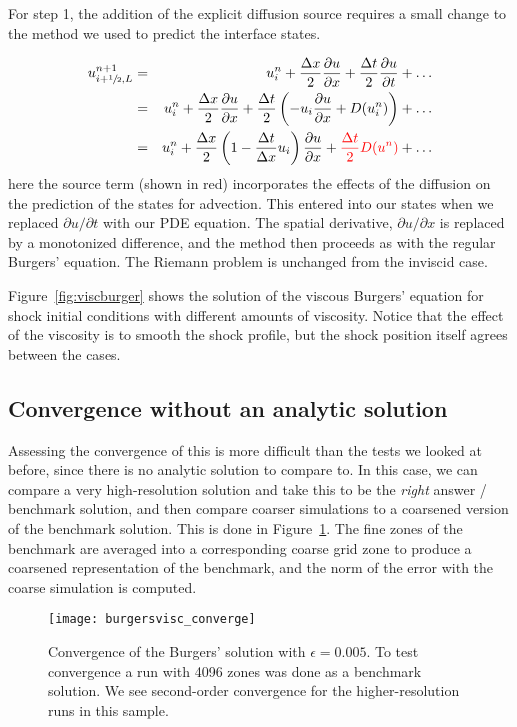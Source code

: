 For step 1, the addition of the explicit diffusion source requires
a small change to the method we used to predict the interface states.

\begin{eqnarray}
u^{n+1}_{i+{\sfrac{1}{2}},L} &=& u^n_i + \frac{\Delta x}{2} \frac{\partial u}{\partial x}
                        + \frac{\Delta t}{2} \frac{\partial u}{\partial t} + \ldots \\
                &=& u^n_i + \frac{\Delta x}{2} \frac{\partial u}{\partial x}
                        + \frac{\Delta t}{2} \left (-u_i \frac{\partial u}{\partial x} + D(u^n_i) \right ) + \ldots \\
                &=& u^n_i + \frac{\Delta x}{2} \left ( 1 - \frac{\Delta t}{\Delta x}u_i \right ) \frac{\partial u}{\partial x} + {\color{red} \frac{\Delta t}{2} D(u^n) } + \ldots
\end{eqnarray}
here the source term (shown in red) incorporates the effects of the
diffusion on the prediction of the states for advection.  This entered
into our states when we replaced $\partial u/\partial t$ with our PDE
equation.  The spatial derivative, $\partial u/\partial x$ is replaced
by a monotonized difference, and the method then proceeds as with the
regular Burgers' equation.  The Riemann problem is unchanged from the
inviscid case.

Figure~\ref{fig:viscburger} shows the solution of the viscous Burgers'
equation for shock initial conditions with different amounts of
viscosity.  Notice that the effect of the viscosity is to smooth the
shock profile, but the shock position itself agrees between the cases.


\subsection{Convergence without an analytic solution}

Assessing the convergence of this is more difficult than the tests we
looked at before, since there is no analytic solution to compare to.
In this case, we can compare a very high-resolution solution and take
this to be the {\em right} answer / benchmark solution, and then
compare coarser simulations to a coarsened version of the benchmark solution.
This is done in Figure~\ref{fig:multiphysics:burgersconverge}.  The
fine zones of the benchmark are averaged into a corresponding coarse grid zone
to produce a coarsened representation of the benchmark, and the norm
of the error with the coarse simulation is computed.

\begin{figure}[t]
\centering
\texttt{[image: burgersvisc\_converge]}
\caption[Convergence of the viscous Burgers' equation]
  {\label{fig:multiphysics:burgersconverge} Convergence of the Burgers'
    solution with $\epsilon = 0.005$.  To test convergence a run with 4096
    zones was done as a benchmark solution.  We see second-order
    convergence for the higher-resolution runs in this sample.\\
   }
\end{figure}
